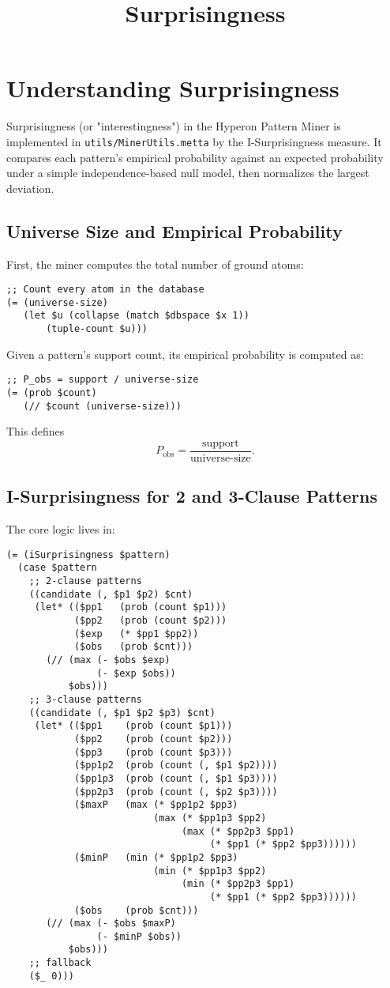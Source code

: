 \documentclass{article}
\title{Surprisingness }
\begin{document}
\section{Understanding Surprisingness}

Surprisingness (or "interestingness") in the Hyperon Pattern Miner is implemented in \texttt{utils/MinerUtils.metta} by the I-Surprisingness measure. It compares each pattern's empirical probability against an expected probability under a simple independence-based null model, then normalizes the largest deviation.

\subsection{Universe Size and Empirical Probability}

First, the miner computes the total number of ground atoms:

\begin{verbatim}
;; Count every atom in the database
(= (universe-size)
   (let $u (collapse (match $dbspace $x 1))
       (tuple-count $u)))
\end{verbatim}

Given a pattern's support count, its empirical probability is computed as:

\begin{verbatim}
;; P_obs = support / universe-size
(= (prob $count)
   (// $count (universe-size)))
\end{verbatim}

This defines
\[
  P_{\mathrm{obs}}
  = \frac{\mathrm{support}}{\text{universe-size}}.
\]
\subsection{I-Surprisingness for 2 and 3-Clause Patterns}

The core logic lives in:

\begin{verbatim}
(= (iSurprisingness $pattern)
  (case $pattern
    ;; 2-clause patterns
    ((candidate (, $p1 $p2) $cnt)
     (let* (($pp1   (prob (count $p1)))
            ($pp2   (prob (count $p2)))
            ($exp   (* $pp1 $pp2))
            ($obs   (prob $cnt)))
       (// (max (- $obs $exp)
                (- $exp $obs))
           $obs)))
    ;; 3-clause patterns
    ((candidate (, $p1 $p2 $p3) $cnt)
     (let* (($pp1    (prob (count $p1)))
            ($pp2    (prob (count $p2)))
            ($pp3    (prob (count $p3)))
            ($pp1p2  (prob (count (, $p1 $p2))))
            ($pp1p3  (prob (count (, $p1 $p3))))
            ($pp2p3  (prob (count (, $p2 $p3))))
            ($maxP   (max (* $pp1p2 $pp3)
                          (max (* $pp1p3 $pp2)
                               (max (* $pp2p3 $pp1)
                                    (* $pp1 (* $pp2 $pp3))))))
            ($minP   (min (* $pp1p2 $pp3)
                          (min (* $pp1p3 $pp2)
                               (min (* $pp2p3 $pp1)
                                    (* $pp1 (* $pp2 $pp3))))))
            ($obs    (prob $cnt)))
       (// (max (- $obs $maxP)
                (- $minP $obs))
           $obs)))
    ;; fallback
    ($_ 0)))
\end{verbatim}
\end{document}
